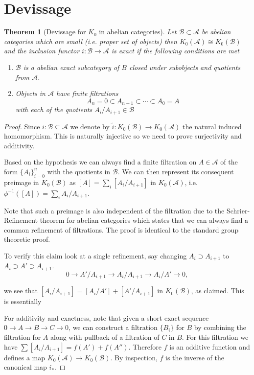 \documentclass[12pt]{report}
\numberwithin{equation}{section}
\newtheorem{theorem}[dummy]{Theorem}
\begin{document}
	\section{Devissage}
	\begin{theorem}[Devissage for $K_0$ in abelian categories]\label{devissagek0}
		Let $\mathcal B \subset \mathcal A$ be abelian categories which are small (i.e. proper set of objects) then $K_0(\mathcal A) \cong K_0(\mathcal B)$ and the inclusion functor $i:\mathcal{B} \to \mathcal{A}$ is exact if the following conditions are met
		\begin{enumerate}
			\item $\mathcal B$ is a abelian exact subcategory of $B$ closed under subobjects and quotients from $\mathcal{A}$.
			\item Objects in $\mathcal{A}$ have finite filtrations \[ A_n=0 \subset A_{n-1} \subset \cdots \subset A_0 =A \] with each of the quotients $A_i/A_{i+1} \in \mathcal{B}$
		\end{enumerate}
	\end{theorem}
	\begin{proof}
		Since $i:\mathcal{B} \subseteq \mathcal{A} $ we denote by $ \tilde{i} : K_0(\mathcal{B}) \to K_0(\mathcal{A})$ the natural induced homomorphism. This is naturally injective so we need to prove surjectivity and additivity.
		
		Based on the hypothesis we can always find a finite filtration on $A \in \mathcal{A}$ of the form $\{A_i\}_{i=0}^n$ with the quotients in $\mathcal{B}$. We can then represent its consequent preimage in $K_0(\mathcal{B})$ as $[A] = \sum_i [A_i / A_{i+1}]$ in $ K_0(\mathcal{A} )$, i.e. $\phi^{-1}([A])=\sum_i A_i/A_{i+1}$.
			
		Note that such a preimage is also independent of the filtration due to the Schrier-Refinement theorem for abelian categories which states that we can always find a common refinement of filtrations. The proof is identical to the standard group theoretic proof.
			
		To verify this claim look at a single refinement, say changing $A_i \supset A_{i+1}$ to $A_i \supset A' \supset A_{i+1}$. 
		\[
		0 \to A' / A_{i+1} \to A_i / A_{i+1} \to A_i / A' \to 0,
		\]
		
		we see that $[A_i / A_{i+1}] = [A_i / A'] + [A' / A_{i+1}]$ in $K_0(\mathcal{B})$, as claimed. This is essentially 
		
		For additivity and exactness, note that given a short exact sequence $0 \to A \to B \to C \to 0$, we can construct a filtration $\{B_i\}$ for $B$ by combining the filtration for $A$ along with pullback of a filtration of $C$ in $B$. For this filtration we have $\sum [A_i / A_{i+1}] = f(A') + f(A'')$. Therefore $f$ is an additive function and defines a map $K_0(\mathcal{A}) \to K_0(\mathcal{B})$. By inspection, $f$ is the inverse of the canonical map $i_*$.
	\end{proof}
\end{document}
